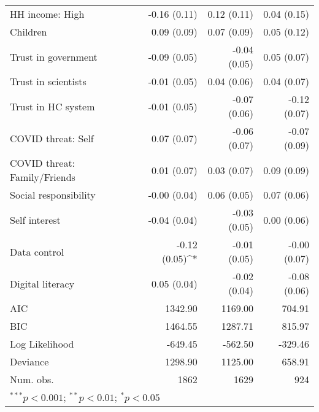 \begin{table}[h!]
\begin{center}
\begin{tabular}{l D{)}{)}{9)3} D{)}{)}{9)3} D{)}{)}{9)3}}
HH income: High              & -0.16 \; (0.11)       & 0.12 \; (0.11)        & 0.04 \; (0.15)        \\
Children                     & 0.09 \; (0.09)        & 0.07 \; (0.09)        & 0.05 \; (0.12)        \\
Trust in government          & -0.09 \; (0.05)       & -0.04 \; (0.05)       & 0.05 \; (0.07)        \\
Trust in scientists          & -0.01 \; (0.05)       & 0.04 \; (0.06)        & 0.04 \; (0.07)        \\
Trust in HC system           & -0.01 \; (0.05)       & -0.07 \; (0.06)       & -0.12 \; (0.07)       \\
COVID threat: Self           & 0.07 \; (0.07)        & -0.06 \; (0.07)       & -0.07 \; (0.09)       \\
COVID threat: Family/Friends & 0.01 \; (0.07)        & 0.03 \; (0.07)        & 0.09 \; (0.09)        \\
Social responsibility        & -0.00 \; (0.04)       & 0.06 \; (0.05)        & 0.07 \; (0.06)        \\
Self interest                & -0.04 \; (0.04)       & -0.03 \; (0.05)       & 0.00 \; (0.06)        \\
Data control                 & -0.12 \; (0.05)^{*}   & -0.01 \; (0.05)       & -0.00 \; (0.07)       \\
Digital literacy             & 0.05 \; (0.04)        & -0.02 \; (0.04)       & -0.08 \; (0.06)       \\
\midrule
AIC                          & 1342.90               & 1169.00               & 704.91                \\
BIC                          & 1464.55               & 1287.71               & 815.97                \\
Log Likelihood               & -649.45               & -562.50               & -329.46               \\
Deviance                     & 1298.90               & 1125.00               & 658.91                \\
Num. obs.                    & 1862                  & 1629                  & 924                   \\
\bottomrule
{}
\end{tabular}
\label{tab:panelattrition-models}
\end{center}
\end{table}
